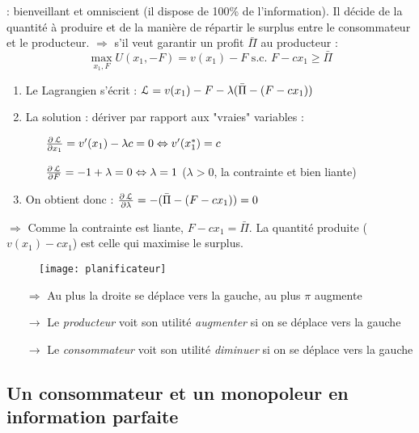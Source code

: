  : bienveillant et omniscient (il dispose de 100\% de l'information). Il décide de la quantité à produire et de la manière de répartir le surplus entre le consommateur et le producteur.
$\Rightarrow$ s'il veut garantir un profit $\bar{\Pi}$ au producteur :
\begin{equation*}
\max_{x_1, F} U(x_1, -F) = v(x_1) - F \text{ s.c. } F - c x_1 \geq \bar{\Pi}
\end{equation*}

\begin{enumerate}
\item Le Lagrangien s'écrit : $\operatorname{\mathcal{L}} = v(x_1) - F - \lambda(\bar{\Pi} - (F - c x_1))$
\item La solution : dériver par rapport aux "vraies" variables :
	\begin{enumerate}
	\item[] $\frac{\partial \operatorname{\mathcal{L}}}{\partial x_1} = v'(x_1) - \lambda c = 0 \Leftrightarrow v'(x^*_1) = c$
	\item[] $\frac{\partial \operatorname{\mathcal{L}}}{\partial F} = - 1 + \lambda = 0 \Leftrightarrow \lambda = 1$ ($\lambda > 0$, la contrainte et bien liante)
	\end{enumerate}
\item On obtient donc : $\frac{\partial \operatorname{\mathcal{L}}}{\partial \lambda} = -(\bar{\Pi} - (F - cx_1)) = 0$
\end{enumerate}
$\Rightarrow$ Comme la contrainte est liante, $F - c x_1 = \bar{\Pi}$.
La quantité produite ($v(x_1) - c x_1$) est celle qui maximise le surplus.
\begin{figure}[H]
	\centering
	\texttt{[image: planificateur]}
\end{figure}
\begin{itemize}
\item[$\Rightarrow$] Au plus la droite se déplace vers la gauche, au plus $\pi$ augmente
\item[$\rightarrow$] Le \textit{producteur} voit son utilité \textit{augmenter} si on se déplace vers la gauche
\item[$\rightarrow$] Le \textit{consommateur} voit son utilité \textit{diminuer} si on se déplace vers la gauche
\end{itemize}

\subsection{Un consommateur et un monopoleur en information parfaite}

